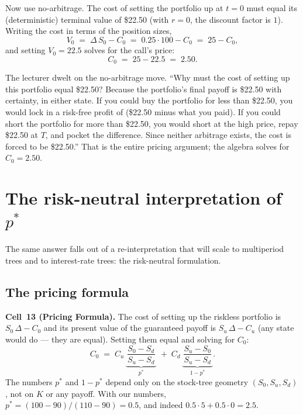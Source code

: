 Now use no-arbitrage. The cost of setting the portfolio up at
$t = 0$ must equal its (deterministic) terminal value of \$22.50
(with $r = 0$, the discount factor is $1$). Writing the cost in
terms of the position sizes,
\[
  V_0 \;=\; \Delta\,S_0 - C_0
       \;=\; 0.25 \cdot 100 - C_0
       \;=\; 25 - C_0,
\]
and setting $V_0 = 22.5$ solves for the call's price:
\[
  C_0 \;=\; 25 - 22.5 \;=\; 2.50.
\]

The lecturer dwelt on the no-arbitrage move. ``Why must the cost of
setting up this portfolio equal \$22.50? Because the portfolio's
final payoff is \$22.50 with certainty, in either state. If you
could buy the portfolio for less than \$22.50, you would lock in a
risk-free profit of (\$22.50 minus what you paid). If you could
short the portfolio for more than \$22.50, you would short at the
high price, repay \$22.50 at $T$, and pocket the difference. Since
neither arbitrage exists, the cost is forced to be \$22.50.'' That
is the entire pricing argument; the algebra solves for $C_0 = 2.50$.

\section{The risk-neutral interpretation of $p^*$}\label{L8-sec:rnpstar}

The same answer falls out of a re-interpretation that will scale to
multiperiod trees and to interest-rate trees: the risk-neutral
formulation.

\subsection{The pricing formula}\label{L8-sec:priceformula}

\begin{keyblock}
\textbf{Cell~13 (Pricing Formula).}
The cost of setting up the riskless portfolio is $S_0\,\Delta - C_0$
and its present value of the guaranteed payoff is $S_u\,\Delta - C_u$
(any state would do --- they are equal). Setting them equal and
solving for $C_0$:
\[
  C_0 \;=\;
    C_u\,\underbrace{\,\frac{S_0 - S_d}{S_u - S_d}\,}_{p^*}
    \;+\;
    C_d\,\underbrace{\,\frac{S_u - S_0}{S_u - S_d}\,}_{1 - p^*}.
\]
The numbers $p^*$ and $1 - p^*$ depend only on the stock-tree
geometry $(S_0, S_u, S_d)$, not on $K$ or any payoff. With our
numbers, $p^* = (100 - 90)/(110 - 90) = 0.5$, and indeed
$0.5 \cdot 5 + 0.5 \cdot 0 = 2.5$.
\end{keyblock}

